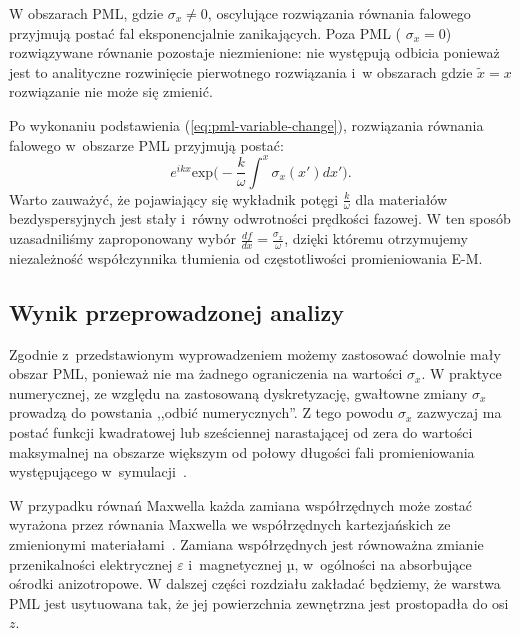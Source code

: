 W obszarach PML, gdzie $\sigma_x\ne0$, oscylujące rozwiązania równania falowego przyjmują postać fal eksponencjalnie zanikających. Poza PML ( $\sigma_x=0$) rozwiązywane równanie pozostaje niezmienione: nie występują odbicia ponieważ jest to analityczne rozwinięcie pierwotnego rozwiązania i~w obszarach gdzie $\tilde{x}=x$ rozwiązanie nie może się zmienić.

Po wykonaniu podstawienia (\ref{eq:pml-variable-change}), rozwiązania równania falowego w~obszarze PML przyjmują postać:
\begin{equation}
e^{ikx}\textrm{exp}\Big(-\frac{k}{\omega}\int^x \sigma_x(x')dx'\Big).
\end{equation}
Warto zauważyć, że pojawiający się wykładnik potęgi $\frac{k}{\omega}$ dla materiałów bezdyspersyjnych jest stały i~równy odwrotności prędkości fazowej. W ten sposób uzasadniliśmy zaproponowany wybór $\frac{df}{dx}=\frac{\sigma_x}{\omega}$, dzięki któremu otrzymujemy niezależność współczynnika tłumienia od częstotliwości promieniowania E-M. 

\subsection{Wynik przeprowadzonej analizy}
Zgodnie z~przedstawionym wyprowadzeniem możemy zastosować dowolnie mały obszar PML, ponieważ nie ma żadnego ograniczenia na wartości $\sigma_x$. W praktyce numerycznej, ze względu na zastosowaną dyskretyzację, gwałtowne zmiany $\sigma_x$ prowadzą do powstania ,,odbić numerycznych''. Z tego powodu $\sigma_x$ zazwyczaj ma postać funkcji kwadratowej lub sześciennej narastającej od zera do wartości maksymalnej na obszarze większym od połowy długości fali promieniowania występującego w~symulacji~\cite{johnson2008notes}.

W przypadku równań Maxwella każda zamiana współrzędnych może zostać wyrażona przez równania Maxwella we współrzędnych kartezjańskich ze zmienionymi materiałami~\cite{ward1996refraction}. Zamiana współrzędnych jest równoważna zmianie przenikalności elektrycznej $\varepsilon$ i~magnetycznej µ, w~ogólności na absorbujące ośrodki anizotropowe. W dalszej części rozdziału zakładać będziemy, że warstwa PML jest usytuowana tak, że jej powierzchnia zewnętrzna jest prostopadła do osi $z$.

